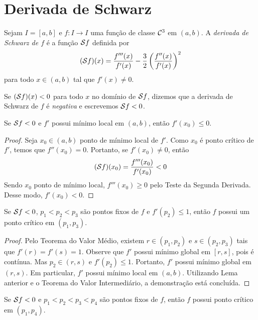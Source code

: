 \section{Derivada de Schwarz}

\begin{definition}
Sejam  $I = [a,b]$ e $f: I \to I$ uma função de classe $\mathcal{C}^3$ em $(a,b)$.  A \textit{derivada de Schwarz de $f$} é a função $\mathcal{S} f$ definida por
$$(\mathcal{S} f)(x) = \frac{f'''(x)}{f'(x)} - \frac{3}{2} \left( \frac{f''(x)}{f'(x)} \right)^2$$
para todo $x \in (a,b)$ tal que $f'(x) \neq 0$.

Se $(\mathcal{S} f)(x) < 0$ para todo $x$ no domínio de $\mathcal{S} f$, dizemos que a derivada de Schwarz de $f$ é \textit{negativa} e escrevemos $\mathcal{S} f < 0$. 
\end{definition}

\begin{lemma}
\label{lemma1}
Se $\mathcal{S} f < 0$ e $f'$ possui mínimo local em $(a,b)$, então $f'(x_0) \leq 0$.
\end{lemma}

\begin{proof}
Seja $x_0 \in (a,b)$ ponto de mínimo local de $f'$. Como $x_0$ é ponto crítico de $f'$, temos que $f''(x_0) = 0$. Portanto, se $f'(x_0) \neq 0$, então
$$(\mathcal{S} f)(x_0) = \frac{f'''(x_0)}{f'(x_0)} < 0$$
Sendo $x_0$ ponto de mínimo local, $f'''(x_0) \geq 0$ pelo Teste da Segunda Derivada. Desse modo, $f'(x_0) < 0$. 
\end{proof}

\begin{lemma}
\label{lemma2}
Se $\mathcal{S} f < 0$, $p_1 < p_2 < p_3$ são pontos fixos de $f$ e $f'(p_2) \leq 1$, então $f$ possui um ponto crítico em $(p_1,p_3)$.
\end{lemma}

\begin{proof}
Pelo Teorema do Valor Médio, existem $r \in (p_1,p_2)$ e $s \in (p_2,p_3)$  tais que $f'(r) = f'(s) = 1$. Observe que $f'$ possui mínimo global em $[r,s]$, pois é contínua. Mas $p_2 \in (r,s)$ e $f'(p_2) \leq 1$. Portanto, $f'$ possui mínimo global em $(r,s)$. Em particular, $f'$ possui mínimo local em $(a,b)$. Utilizando Lema anterior e o Teorema do Valor Intermediário, a demonstração está concluída.
\end{proof}

\begin{lemma}
\label{lemma3}
Se $\mathcal{S} f < 0$ e $p_1<p_2<p_3<p_4$ são pontos fixos de $f$, então $f$ possui ponto crítico em $(p_1,p_4)$.
\end{lemma}

